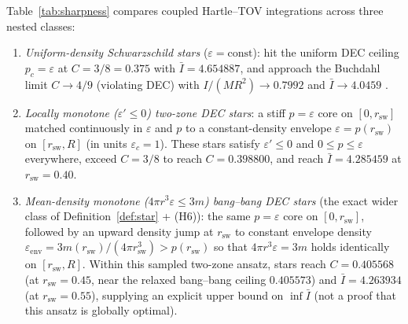 \documentclass[11pt]{article}
\theoremstyle{plain}
\theoremstyle{definition}
\newcommand{\eps}{\varepsilon}
\newcommand{\Ibar}{\bar{I}}
\begin{document}
Table~\ref{tab:sharpness} compares coupled Hartle--TOV integrations across three nested classes:
\begin{enumerate}
  \item \emph{Uniform-density Schwarzschild stars} ($\eps = \text{const}$): hit the uniform DEC ceiling $p_c = \eps$ at $C = 3/8 = 0.375$ with $\Ibar = 4.654887$, and approach the Buchdahl limit $C \to 4/9$ (violating DEC) with $I/(MR^2) \to 0.7992$ and $\Ibar \to 4.0459$ \cite{ChandrasekharMiller1974,Hartle1978,Posada2017}.
  \item \emph{Locally monotone ($\eps' \le 0$) two-zone DEC stars}: a stiff $p = \eps$ core on $[0, r_{\mathrm{sw}}]$ matched continuously in $\eps$ and $p$ to a constant-density envelope $\eps = p(r_{\mathrm{sw}})$ on $[r_{\mathrm{sw}}, R]$ (in units $\eps_c = 1$). These stars satisfy $\eps' \le 0$ and $0 \le p \le \eps$ everywhere, exceed $C = 3/8$ to reach $C = 0.398800$, and reach $\Ibar = 4.285459$ at $r_{\mathrm{sw}} = 0.40$.
  \item \emph{Mean-density monotone ($4\pi r^3 \eps \le 3 m$) bang--bang DEC stars} (the exact wider class of Definition~\ref{def:star} + (H6)): the same $p = \eps$ core on $[0, r_{\mathrm{sw}}]$, followed by an upward density jump at $r_{\mathrm{sw}}$ to constant envelope density $\eps_{\mathrm{env}} = 3 m(r_{\mathrm{sw}})/(4\pi r_{\mathrm{sw}}^3) > p(r_{\mathrm{sw}})$ so that $4\pi r^3 \eps = 3 m$ holds identically on $[r_{\mathrm{sw}}, R]$. Within this sampled two-zone ansatz, stars reach $C = 0.405568$ (at $r_{\mathrm{sw}} = 0.45$, near the relaxed bang--bang ceiling $0.405573$) and $\Ibar = 4.263934$ (at $r_{\mathrm{sw}} = 0.55$), supplying an explicit upper bound on $\inf \Ibar$ (not a proof that this ansatz is globally optimal).
\end{enumerate}
\end{document}
